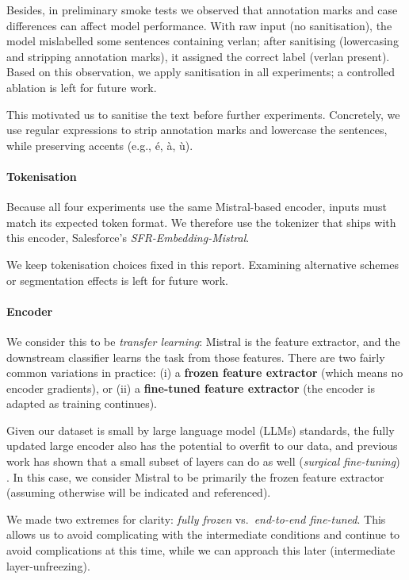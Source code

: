 \documentclass[12pt]{article}
\begin{document}
Besides, in preliminary smoke tests we observed that annotation marks and case differences can affect model performance. With raw input (no sanitisation), the model mislabelled some sentences containing verlan; after sanitising (lowercasing and stripping annotation marks), it assigned the correct label (verlan present). Based on this observation, we apply sanitisation in all experiments; a controlled ablation is left for future work.

This motivated us to sanitise the text before further experiments. Concretely, we use regular expressions to strip annotation marks and lowercase the sentences, while preserving accents (e.g., é, à, ù).

\paragraph{Tokenisation}
Because all four experiments use the same Mistral-based encoder, inputs must match its expected token format. We therefore use the tokenizer that ships with this encoder, Salesforce's \textit{SFR-Embedding-Mistral}.

We keep tokenisation choices fixed in this report. Examining alternative schemes or segmentation effects is left for future work.

\paragraph{Encoder}
We consider this to be \textit{transfer learning}: Mistral is the feature extractor, and the downstream classifier learns the task from those features. There are two fairly common variations in practice: (i) a \textbf{frozen feature extractor} (which means no encoder gradients), or (ii) a \textbf{fine-tuned feature extractor} (the encoder is adapted as training continues).

Given our dataset is small by large language model (LLMs) standards, the fully updated large encoder also has the potential to overfit to our data, and previous work has shown that a small subset of layers can do as well (\emph{surgical fine-tuning}) \cite{lodha2023surgical}. In this case, we consider Mistral to be primarily the frozen feature extractor (assuming otherwise will be indicated and referenced). 

We made two extremes for clarity: \emph{fully frozen} vs.\ \emph{end-to-end fine-tuned}. This allows us to avoid complicating with the intermediate conditions and continue to avoid complications at this time, while we can approach this later (intermediate layer-unfreezing).
\end{document}

